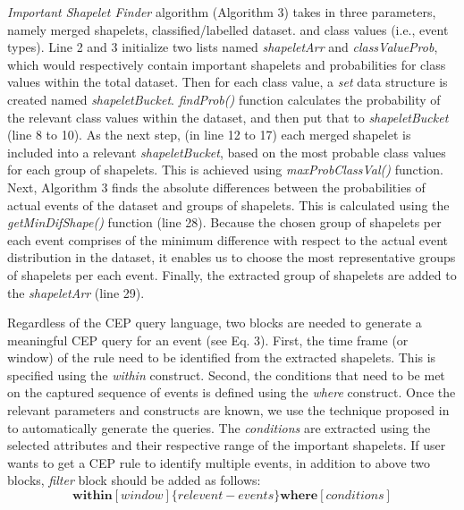 \documentclass[conference]{IEEEtran}  %
\begin{document}

\textit{Important Shapelet Finder} algorithm (Algorithm 3) takes in three parameters, namely merged shapelets, classified/labelled dataset. and class values (i.e., event types). Line 2 and 3 initialize two lists named \textit{shapeletArr} and \textit{classValueProb}, which would respectively contain important shapelets and probabilities for class values within the total dataset. Then for each class value, a \textit{set} data structure is created named \textit{shapeletBucket}. \textit{findProb()} function calculates the probability of the relevant class values within the dataset, and then put that to \textit{shapeletBucket} (line 8 to 10). As the next step, (in line 12 to 17) each merged shapelet is included into a relevant \textit{shapeletBucket}, based on the most probable class values for each group of shapelets. This is achieved using \textit{maxProbClassVal()} function. Next, Algorithm 3 finds the absolute differences between the probabilities of actual events of the dataset and groups of shapelets. This is calculated using the \textit{getMinDifShape()} function (line 28). Because the chosen group of shapelets per each event comprises of the minimum difference with respect to the actual event distribution in the dataset, it enables us to choose the most representative groups of shapelets per each event. Finally, the extracted group of shapelets are added to the \textit{shapeletArr} (line 29).

Regardless of the CEP query language, two blocks are needed to generate a meaningful CEP query for an event (see Eq. 3). First, the time frame (or window) of the rule need to be identified from the extracted shapelets. This is specified using the \textit{within} construct. Second, the conditions that need to be met on the captured sequence of events is defined using the \textit{where} construct. Once the relevant parameters and constructs are known, we use the technique proposed in \cite{IEEEexample:autoCEP} to automatically generate the queries.
 The \textit{conditions} are extracted using the selected attributes and their respective range of the important shapelets. If user wants to get a CEP rule to identify multiple events, in addition to above two blocks, \textit{filter} block should be added as follows:
\begin{equation}
\textbf{within}[window] \{relevent-events\} \textbf{where}[conditions]
\label{eq:releventEvents}
\end{equation}
\end{document}

